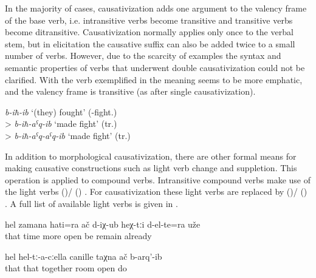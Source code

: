 In the majority of cases, causativization adds one argument to the valency frame of the base verb, i.e. intransitive verbs become transitive and transitive verbs become ditransitive.
Causativization normally applies only once to the verbal stem, but in elicitation the causative suffix can also be added twice to a small number of verbs. However, due to the scarcity of examples the syntax and semantic properties of verbs that underwent double causativization could not be clarified. With the verb exemplified in  the meaning seems to be more emphatic, and the valency frame is transitive (as after single causativization). 

\begin{exe} 
	\ex	\label{ex:causativizedVerbFight} 
	\textit{b-iħ-ib} `(they) fought' (-fight.) \\
	> \textit{b-iħ-aˁq-ib} `made fight' (tr.) \\
	> \textit{b-iħ-aˁq-aˁq-ib} `made fight' (tr.)
\end{exe}


In addition to morphological causativization, there are other formal means for making causative constructions such as light verb change and suppletion. This operation is applied to compound verbs. Intransitive compound verbs make use of the light verbs  ()\slash{} ()  . For causativization these light verbs are replaced by  ()\slash{} ()  . A full list of available light verbs is given in .  

%
\begin{exe}
	\ex	\label{ex:‎At that time they (the trousers) opened even more}
	\gll	hel	zamana	hati=ra	ač	d-iχ-ub	heχ-tːi	d-el-te=ra	uže\\
		that	time	more	open	be		remain	already\\
	\glt	{}

	\ex	\label{ex:‎He opened the room together with them}
	\gll	hel	hel-tː-a-cːella	canille	taχna	ač	b-arq'-ib\\
		that	that	together	room	open	do\\
	\glt	{}
\end{exe}

